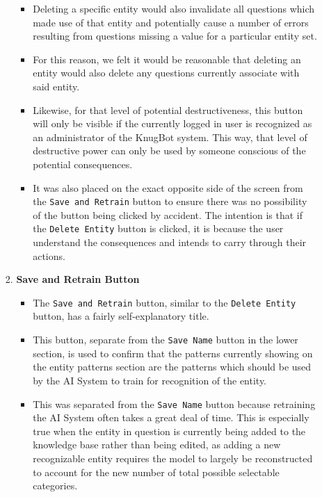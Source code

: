 \documentclass[titlepage, 12pt]{article}
\begin{document}
\begin{enumerate}
\begin{itemize}
\begin{enumerate}
\begin{itemize}
                \item Deleting a specific entity would also invalidate all questions which made use of that entity and potentially cause a number of errors resulting from questions missing a value for a particular entity set. 
                \item For this reason, we felt it would be reasonable that deleting an entity would also delete any questions currently associate with said entity.
                \item Likewise, for that level of potential destructiveness, this button will only be visible if the currently logged in user is recognized as an administrator of the KnugBot system. This way, that level of destructive power can only be used by someone conscious of the potential consequences.
                \item It was also placed on the exact opposite side of the screen from the \texttt{Save and Retrain} button to ensure there was no possibility of the button being clicked by accident. The intention is that if the \texttt{Delete Entity} button is clicked, it is because the user understand the consequences and intends to carry through their actions.
            \end{itemize}
            \item \textbf{Save and Retrain Button}
            \begin{itemize}
                \item The \texttt{Save and Retrain} button, similar to the \texttt{Delete Entity} button, has a fairly self-explanatory title.
                \item This button, separate from the \texttt{Save Name} button in the lower section, is used to confirm that the patterns currently showing on the entity patterns section are the patterns which should be used by the AI System to train for recognition of the entity.
                \item This was separated from the \texttt{Save Name} button because retraining the AI System often takes a great deal of time. This is especially true when the entity in question is currently being added to the knowledge base rather than being edited, as adding a new recognizable entity requires the model to largely be reconstructed to account for the new number of total possible selectable categories.
            \end{itemize}
        \end{enumerate}
    \end{itemize}
\end{enumerate}
\end{document}
